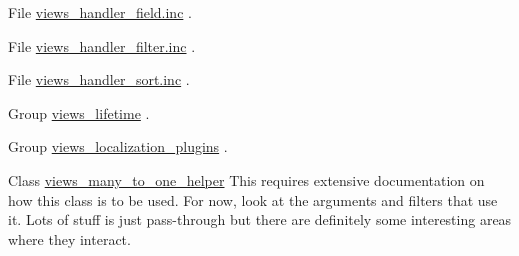\label{todo__todo000045}
\hypertarget{todo__todo000045}{}
 
\begin{DoxyDescription}
\item[File \hyperlink{views__handler__field_8inc}{views\_\-handler\_\-field.inc} ]. 
\end{DoxyDescription}

\label{todo__todo000046}
\hypertarget{todo__todo000046}{}
 
\begin{DoxyDescription}
\item[File \hyperlink{views__handler__filter_8inc}{views\_\-handler\_\-filter.inc} ]. 
\end{DoxyDescription}

\label{todo__todo000047}
\hypertarget{todo__todo000047}{}
 
\begin{DoxyDescription}
\item[File \hyperlink{views__handler__sort_8inc}{views\_\-handler\_\-sort.inc} ]. 
\end{DoxyDescription}

\label{todo__todo000059}
\hypertarget{todo__todo000059}{}
 
\begin{DoxyDescription}
\item[Group \hyperlink{group__views__lifetime}{views\_\-lifetime} ].


\end{DoxyDescription}

\label{todo__todo000057}
\hypertarget{todo__todo000057}{}
 
\begin{DoxyDescription}
\item[Group \hyperlink{group__views__localization__plugins}{views\_\-localization\_\-plugins} ].


\end{DoxyDescription}

\label{todo__todo000052}
\hypertarget{todo__todo000052}{}
 
\begin{DoxyDescription}
\item[Class \hyperlink{classviews__many__to__one__helper}{views\_\-many\_\-to\_\-one\_\-helper} ]This requires extensive documentation on how this class is to be used. For now, look at the arguments and filters that use it. Lots of stuff is just pass-\/through but there are definitely some interesting areas where they interact.


\end{DoxyDescription}

